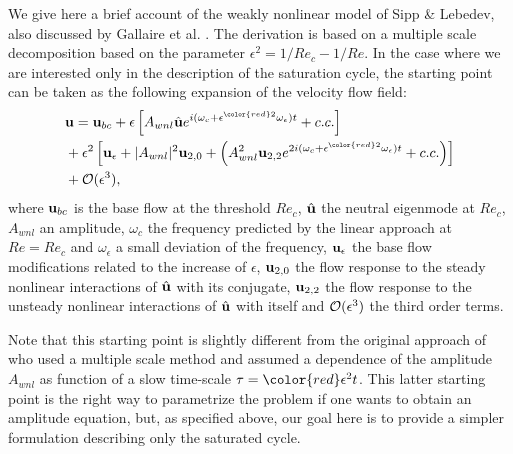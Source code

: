 \documentclass[twocolumn,10pt]{asme2ej}
\newcommand{\be}[1]{ \begin{equation} \label{#1}}
\newcommand{\ee}{\end{equation}}
\begin{document}
We give here a brief account of the weakly nonlinear model of Sipp \& 
Lebedev\cite{SippLebedev}, also discussed by Gallaire et al. \cite{FDR2016}. 
The derivation is based on a multiple scale  decomposition based on the parameter {\color{red}$\epsilon^2 = 1/Re_c - 1/Re$}. 
In the case where we are interested only in the {\color{red}description} of the saturation cycle, the starting point can be taken as the following expansion of %
 {\color{red}the velocity flow field:} 
 {\color{red}
\be{WNL1}
\begin{aligned}
&{\bf u} = {}  {\bf u}_{bc} + \epsilon \left[ A_{wnl}  \hat{\bf u} e^{i (\omega_c+\epsilon^{\color{red}2} \omega_\epsilon)  t} + c.c. \right]\\
&+ \epsilon^2 \left[ {\bf u}_\epsilon + |A_{wnl}|^2  {\bf u}_{2,0} + \left(  A_{wnl}^2 {\bf u}_{2,2} e^{2 i(\omega_c+\epsilon^{\color{red}2} \omega_\epsilon)  t} + c.c. \right) \right]\\
& + {\cal O}( \epsilon ^3),
\end{aligned}
\ee
}
where {\color{red}${\bf u}_{bc}$} is the base flow at the threshold $Re_c$, {\color{red} $\hat{\bf u}$} the neutral 
eigenmode at $Re_c$, {\color{red} $A_{wnl}$ an amplitude,} $\omega_c$ the frequency predicted by the linear approach at $Re=Re_c$ and $\omega_\epsilon$ a small deviation of the frequency, {\color{red} ${\bf u}_{\epsilon}$ the base flow modifications related to the increase of $\epsilon$, ${\bf u}_{2,0}$ the flow response to the steady nonlinear interactions of $\hat{\bf u}$ with its conjugate, ${\bf u}_{2,2}$ the flow response to the unsteady nonlinear interactions of $\hat{\bf u}$ with itself and  ${\cal O}( \epsilon ^3)$ the third order terms.   }

Note that this starting point is slightly different from the original approach of \cite{SippLebedev} who used a multiple scale method and assumed a dependence of the amplitude $A_{wnl}$ as function of a slow time-scale $\tau = {\color{red}\epsilon^2} t$. This latter starting point is the {\color{red}right} way to parametrize the problem if one wants to obtain an amplitude equation, but{\color{red},} as specified above{\color{red},} our goal here is to provide a simpler formulation {\color{red}describing} only the saturated cycle. 
\end{document}
